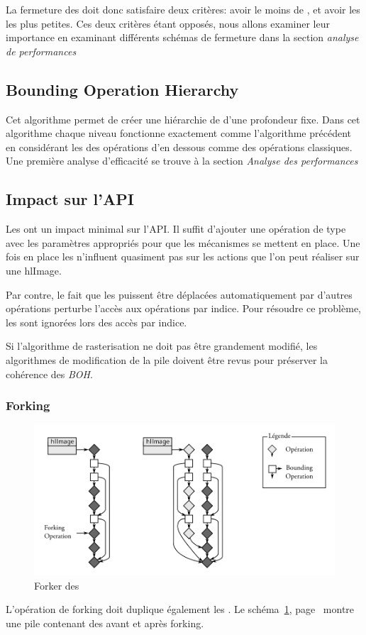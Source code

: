 			La fermeture des \BO doit donc satisfaire deux critères: avoir le moins de \BO, et avoir les \BO les plus petites. 
			Ces deux critères étant opposés, nous allons examiner leur importance en examinant différents schémas de fermeture
			dans la section \emph{analyse de performances}
			

		\subsection{Bounding Operation Hierarchy}
			Cet algorithme permet de créer une hiérarchie de \BO d'une profondeur fixe. Dans cet algorithme chaque niveau
			fonctionne exactement comme l'algorithme précédent en considérant les \BO des opérations d'en dessous comme
			des opérations classiques. Une première analyse d'efficacité se trouve à la section \emph{Analyse des performances}


		\subsection{Impact sur l'API}
			Les \BO ont un impact minimal sur l'API. Il suffit d'ajouter une opération de type \BO avec les paramètres
			appropriés pour que les mécanismes se mettent en place. Une fois en place les \BO n'influent quasiment pas
			sur les actions que l'on peut réaliser sur une hlImage. 

			Par contre, le fait que les \BO puissent être déplacées automatiquement par d'autres opérations perturbe
			l'accès aux opérations par indice. Pour résoudre ce problème, les \BO sont ignorées lors des accès par
			indice. 

			Si l'algorithme de rasterisation ne doit pas être grandement modifié, les algorithmes de modification
			de la pile doivent être revus pour préserver la cohérence des \emph{BOH}.

			\subsubsection{Forking}
			\begin{figure}[ht]
				\centering
				\includegraphics[width=\textwidth]{images/bo-forking} 
				\caption{Forker des \BO}
				\label{fig:bo-forking}
			\end{figure}
			L'opération de forking doit duplique également les \BO. Le schéma~\ref{fig:bo-forking}, page~\pageref{fig:bo-forking} montre une pile
			contenant des \BO avant et après forking. 

